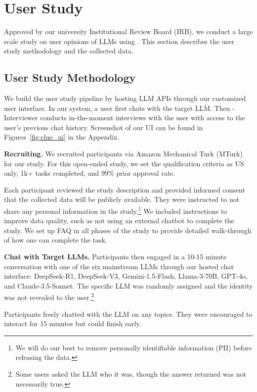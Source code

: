 

\section{User Study}
\label{sec.userstudy}

Approved by our university Institutional Review Board (IRB), we conduct a large scale study on user opinions of LLMs using \method{}. This section describes the user study methodology and the collected data.

\subsection{User Study Methodology}

We build the user study pipeline by hosting LLM APIs through our customized user interface. In our system, a user first chats with the target LLM. Then \method{}-Interviewer conducts in-the-moment interviews with the user with access to the user's previous chat history. Screenshot of our UI can be found in Figures~\ref{fig:clue_ui} in the Appendix.

\textbf{Recruiting.} We recruited participants via Amazon Mechanical Turk (MTurk) for our study. 
For this open-ended study, we set the qualification criteria as US only, 1k+ tasks completed, and 99\% prior approval rate.

Each participant reviewed the study description and provided informed consent that the collected data will be publicly available.  
They were instructed to not share any personal information in the study.\footnote{We will do our best to remove personally identifiable
information (PII) before releasing the data.} 
We included instructions to improve data quality, such as not using an external chatbot to complete the study. We set up FAQ in all phases of the study to provide detailed walk-through of how one can complete the task. 

\textbf{Chat with Target LLMs.} Participants then engaged in a 10-15 minute conversation with one of the six mainstream LLMs through our hosted chat interface: DeepSeek-R1, DeepSeek-V3, Gemini-1.5-Flash, Llama-3-70B, GPT-4o, and Claude-3.5-Sonnet.
The specific LLM was randomly assigned and the identity was not revealed to the user.\footnote{Some users asked the LLM who it was, though the answer returned was not necessarily true.} 

Participants freely chatted with the LLM on any topics. They were encouraged to interact for 15 minutes but could finish early.

